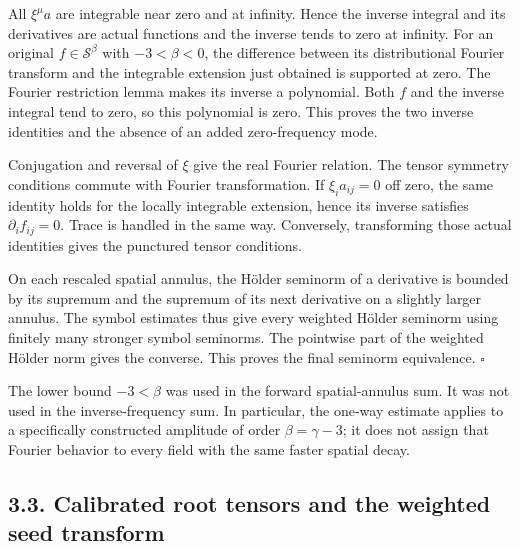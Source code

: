 \documentclass[
  english,
  11pt,
  reqno]{amsart}
\begin{document}
All \(\xi^\mu a\) are integrable near zero and at infinity. Hence the
inverse integral and its derivatives are actual functions and the
inverse tends to zero at infinity. For an original
\(f\in\mathscr S^\beta\) with \(-3<\beta<0\), the difference between its
distributional Fourier transform and the integrable extension just
obtained is supported at zero. The Fourier restriction lemma makes its
inverse a polynomial. Both \(f\) and the inverse integral tend to zero,
so this polynomial is zero. This proves the two inverse identities and
the absence of an added zero-frequency mode.

Conjugation and reversal of \(\xi\) give the real Fourier relation. The
tensor symmetry conditions commute with Fourier transformation. If
\(\xi_i a_{ij}=0\) off zero, the same identity holds for the locally
integrable extension, hence its inverse satisfies
\(\partial_i f_{ij}=0\). Trace is handled in the same way. Conversely,
transforming those actual identities gives the punctured tensor
conditions.

On each rescaled spatial annulus, the Hölder seminorm of a derivative is
bounded by its supremum and the supremum of its next derivative on a
slightly larger annulus. The symbol estimates thus give every weighted
Hölder seminorm using finitely many stronger symbol seminorms. The
pointwise part of the weighted Hölder norm gives the converse. This
proves the final seminorm equivalence. \hfill\(\square\)

The lower bound \(-3<\beta\) was used in the forward spatial-annulus
sum. It was not used in the inverse-frequency sum. In particular, the
one-way estimate applies to a specifically constructed amplitude of
order \(\beta=\gamma-3\); it does not assign that Fourier behavior to
every field with the same faster spatial decay.

\subsection{3.3. Calibrated root tensors and the weighted seed
transform}\label{calibrated-root-tensors-and-the-weighted-seed-transform}\label{sec:online-root-calibration-and-seeds}
\end{document}
